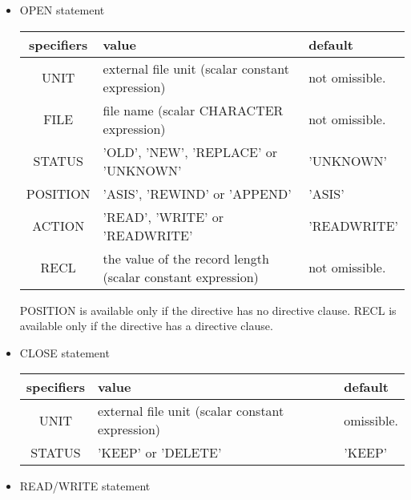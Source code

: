    \begin{itemize}
   \item OPEN statement
   
   \begin{table}[h]
    \begin{center}
     \label{tb:globalopen}
     \begin{tabular}{|c||p{90mm}|l|}
       \hline
      specifiers & value & default \\ \hline \hline
      UNIT & external file unit (scalar constant expression)
	  & not omissible. \\ \hline
      FILE & file name (scalar CHARACTER expression)
	  & not omissible. \\ \hline
      STATUS & 'OLD', 'NEW', 'REPLACE' or 'UNKNOWN' & 'UNKNOWN' \\ \hline
      POSITION & 'ASIS', 'REWIND' or 'APPEND' & 'ASIS' \\ \hline
      ACTION & 'READ', 'WRITE' or 'READWRITE' & 'READWRITE' \\ \hline
      RECL & the value of the record length (scalar constant expression)
	  & not omissible. \\ \hline
     \end{tabular}
    \end{center}
   \end{table}

   POSITION is available only if the directive has no directive clause.
   RECL is available only if the directive has a directive clause.

   \item CLOSE statement
	  
   \begin{table}[h]
    \begin{center}
     \label{tb:globalopen}
     \begin{tabular}{|c||p{90mm}|l|}
        \hline
      specifiers & value & default \\ \hline \hline
      UNIT & external file unit (scalar constant expression)
	  & omissible. \\ \hline
      STATUS & 'KEEP' or 'DELETE'
	  & 'KEEP' \\ \hline
     \end{tabular}
    \end{center}
   \end{table}

    \item READ/WRITE statement


\end{itemize}
